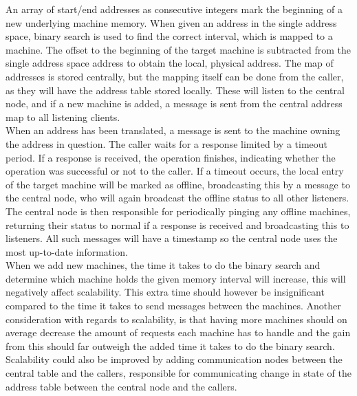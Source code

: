\documentclass[12pt]{article}
\begin{document}
An array of start/end addresses as consecutive integers mark the beginning of a new underlying machine memory. When given an address in the single address space, binary search is used to find the correct interval, which is mapped to a machine. The offset to the beginning of the target machine is subtracted from the single address space address to obtain the local, physical address. The map of addresses is stored centrally, but the mapping itself can be done from the caller, as they will have the address table stored locally. These will listen to the central node, and if a new machine is added, a message is sent from the central address map to all listening clients. \\
When an address has been translated, a message is sent to the machine owning the address in question. The caller waits for a response limited by a timeout period. If a response is received, the operation finishes, indicating whether the operation was successful or not to the caller. If a timeout occurs, the local entry of the target machine will be marked as offline, broadcasting this by a message to the central node, who will again broadcast the offline status to all other listeners. The central node is then responsible for periodically pinging any offline machines, returning their status to normal if a response is received and broadcasting this to listeners. All such messages will have a timestamp so the central node uses the most up-to-date information.\\
When we add new machines, the time it takes to do the binary search and determine which machine holds the given memory interval will increase, this will negatively affect scalability. This extra time should however be insignificant compared to the time it takes to send messages between the machines. Another consideration with regards to scalability, is that having more machines should on average decrease the amount of requests each machine has to handle and the gain from this should far outweigh the added time it takes to do the binary search. 
Scalability could also be improved by adding communication nodes between the central table and the callers, responsible for communicating change in state of the address table between the central node and the callers.
\end{document}
